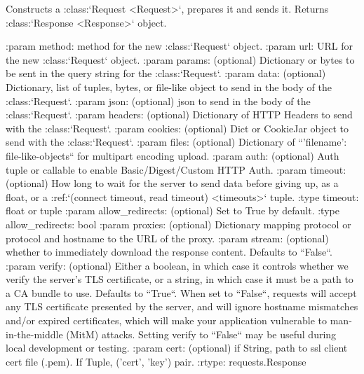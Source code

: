 \begin{DoxyVerb}Constructs a :class:`Request <Request>`, prepares it and sends it.
Returns :class:`Response <Response>` object.

:param method: method for the new :class:`Request` object.
:param url: URL for the new :class:`Request` object.
:param params: (optional) Dictionary or bytes to be sent in the query
    string for the :class:`Request`.
:param data: (optional) Dictionary, list of tuples, bytes, or file-like
    object to send in the body of the :class:`Request`.
:param json: (optional) json to send in the body of the
    :class:`Request`.
:param headers: (optional) Dictionary of HTTP Headers to send with the
    :class:`Request`.
:param cookies: (optional) Dict or CookieJar object to send with the
    :class:`Request`.
:param files: (optional) Dictionary of ``'filename': file-like-objects``
    for multipart encoding upload.
:param auth: (optional) Auth tuple or callable to enable
    Basic/Digest/Custom HTTP Auth.
:param timeout: (optional) How long to wait for the server to send
    data before giving up, as a float, or a :ref:`(connect timeout,
    read timeout) <timeouts>` tuple.
:type timeout: float or tuple
:param allow_redirects: (optional) Set to True by default.
:type allow_redirects: bool
:param proxies: (optional) Dictionary mapping protocol or protocol and
    hostname to the URL of the proxy.
:param stream: (optional) whether to immediately download the response
    content. Defaults to ``False``.
:param verify: (optional) Either a boolean, in which case it controls whether we verify
    the server's TLS certificate, or a string, in which case it must be a path
    to a CA bundle to use. Defaults to ``True``. When set to
    ``False``, requests will accept any TLS certificate presented by
    the server, and will ignore hostname mismatches and/or expired
    certificates, which will make your application vulnerable to
    man-in-the-middle (MitM) attacks. Setting verify to ``False`` 
    may be useful during local development or testing.
:param cert: (optional) if String, path to ssl client cert file (.pem).
    If Tuple, ('cert', 'key') pair.
:rtype: requests.Response
\end{DoxyVerb}
 \mbox{\label{classpip_1_1__vendor_1_1requests_1_1sessions_1_1Session_a91945638c6510c607f67b24ad05a3275}} 
